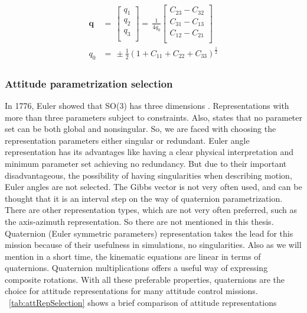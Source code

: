 \begin{align}\label{eqn:quat4}
\begin{split}
\bm{q}
& =\,
\begin{bmatrix}
q_1\\[0.3em]
q_2\\[0.3em]
q_3\\[0.3em]
\end{bmatrix}
 =\,
\frac{1}{4q_0}
\begin{bmatrix}
C_{23} - C_{32}\\[0.3em]
C_{31} - C_{13}\\[0.3em]
C_{12} - C_{21}\\[0.3em]
\end{bmatrix}
\\
q_0
& =\,
\pm{\frac{1}{2}}{(1 + C_{11} + C_{22} + C_{33})}^{\frac{1}{2}}
\end{split}
\end{align}

\subsubsection{Attitude parametrization selection}

In 1776, Euler showed that SO(3) has three dimensions \cite{stuelpnagel1964parametrization}. 
Representations with more than three parameters subject to constraints. 
Also, \cite{stuelpnagel1964parametrization} states that no parameter set 
can be both global and nonsingular. So, we are faced with choosing the 
representation parameters either singular or redundant. 
Euler angle representation has its advantages like having a clear 
physical interpretation and minimum parameter set achieving no
redundancy. But due to their important disadvantageous, the possibility 
of having singularities when describing motion, Euler angles are not selected.
The Gibbs vector is not very often used, and can be thought that it is 
an interval step on the way of quaternion parametrization. 
There are other representation types, which are not very often 
preferred, such as the axis-azimuth representation. So there 
are not mentioned in this thesis. 
Quaternion (Euler symmetric parameters) representation takes 
the lead for this mission because of their usefulness in simulations, 
no singularities. Also as we will mention in a short time, the kinematic 
equations are linear in terms of quaternions. Quaternion multiplications 
offers a useful way of expressing composite rotations. With all these 
preferable properties, quaternions are the choice for attitude representations 
for many attitude control missions. ~\ref{tab:attRepSelection} shows a brief comparison of attitude representations \cite{bak1999spacecraft}

